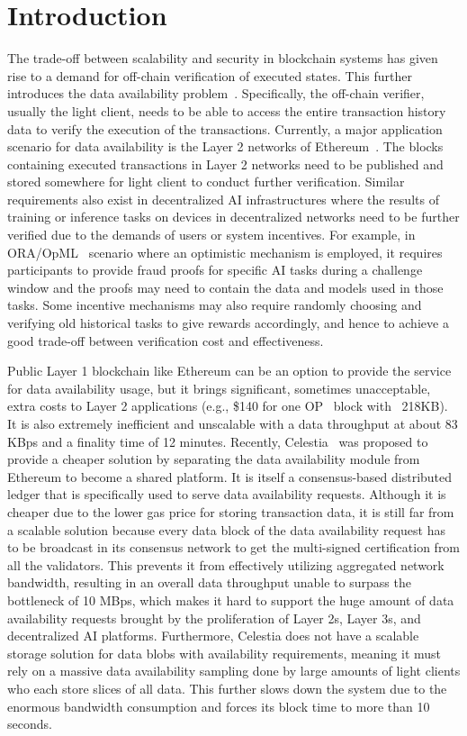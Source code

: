 \section{Introduction}

The trade-off between scalability and security in blockchain systems has given rise to a demand for off-chain verification of executed states. This further introduces the data availability problem~\cite{da}. Specifically, the off-chain verifier, usually the light client, needs to be able to access the entire transaction history data to verify the execution of the transactions. 
Currently, a major application scenario for data availability is the Layer 2 networks of Ethereum~\cite{Ethereum}. The blocks containing executed transactions in Layer 2 networks need to be published and stored somewhere for light client to conduct further verification. Similar requirements also exist in decentralized AI infrastructures where the results of training or inference tasks on devices in decentralized networks need to be further verified due to the demands of users or system incentives. 
For example, in ORA/OpML~\cite{opml} scenario where an optimistic mechanism is employed, it requires participants to provide fraud proofs for specific AI tasks during a challenge window and the proofs may need to contain the data and models used in those tasks. 
Some incentive mechanisms may also require randomly choosing and verifying old historical tasks to give rewards accordingly, and hence to achieve a good trade-off between verification cost and effectiveness. 

Public Layer 1 blockchain like Ethereum can be an option to provide the service for data availability usage, but it brings significant, sometimes unacceptable, extra costs to Layer 2 applications (e.g., \$140 for one OP~\cite{op} block with ~218KB). It is also extremely inefficient and unscalable with a data throughput at about 83 KBps and a finality time of 12 minutes. Recently, Celestia~\cite{celestia} was proposed to provide a cheaper solution by separating the data availability module from Ethereum to become a shared platform. It is itself a consensus-based distributed ledger that is specifically used to serve data availability requests. Although it is cheaper due to the lower gas price for storing transaction data, it is still far from a scalable solution because every data block of the data availability request has to be broadcast in its consensus network to get the multi-signed certification from all the validators. This prevents it from effectively utilizing aggregated network bandwidth, resulting in an overall data throughput unable to surpass the bottleneck of 10 MBps, which makes it hard to support the huge amount of data availability requests brought by the proliferation of Layer 2s, Layer 3s, and decentralized AI platforms. 
Furthermore, Celestia does not have a scalable storage solution for data blobs with availability requirements, meaning it must rely on a massive data availability sampling done by large amounts of light clients who each store slices of all data. This further slows down the system due to the enormous bandwidth consumption and forces its block time to more than 10 seconds. 

